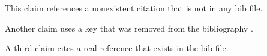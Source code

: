\documentclass{article}
\begin{document}
This claim references a nonexistent citation \cite{fake2024} that is not in any bib file.

Another claim uses a key that was removed from the bibliography \cite{missing_ref}.

A third claim cites a real reference \cite{real2024} that exists in the bib file.
\end{document}
